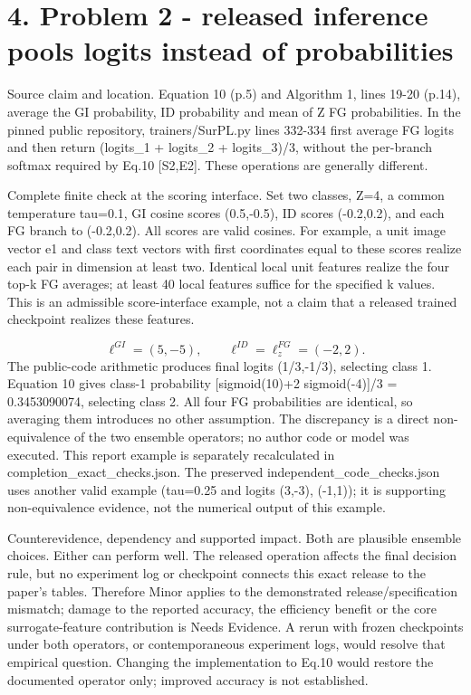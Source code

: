 \documentclass[10pt]{article}
\begin{document}
\section*{4. Problem 2 - released inference pools logits instead of probabilities}
Source claim and location. Equation 10 (p.5) and Algorithm 1, lines 19-20 (p.14), average the GI probability, ID probability and mean of Z FG probabilities. In the pinned public repository, trainers/SurPL.py lines 332-334 first average FG logits and then return (logits\_1 + logits\_2 + logits\_3)/3, without the per-branch softmax required by Eq.10 [S2,E2]. These operations are generally different.\par
Complete finite check at the scoring interface. Set two classes, Z=4, a common temperature tau=0.1, GI cosine scores (0.5,-0.5), ID scores (-0.2,0.2), and each FG branch to (-0.2,0.2). All scores are valid cosines. For example, a unit image vector e1 and class text vectors with first coordinates equal to these scores realize each pair in dimension at least two. Identical local unit features realize the four top-k FG averages; at least 40 local features suffice for the specified k values. This is an admissible score-interface example, not a claim that a released trained checkpoint realizes these features.\par
\[\ell^{GI}=(5,-5),\qquad\ell^{ID}=\ell^{FG}_z=(-2,2).\] The public-code arithmetic produces final logits (1/3,-1/3), selecting class 1. Equation 10 gives class-1 probability [sigmoid(10)+2 sigmoid(-4)]/3 = 0.3453090074, selecting class 2. All four FG probabilities are identical, so averaging them introduces no other assumption. The discrepancy is a direct non-equivalence of the two ensemble operators; no author code or model was executed. This report example is separately recalculated in completion\_exact\_checks.json. The preserved independent\_code\_checks.json uses another valid example (tau=0.25 and logits (3,-3), (-1,1)); it is supporting non-equivalence evidence, not the numerical output of this example.\par
Counterevidence, dependency and supported impact. Both are plausible ensemble choices. Either can perform well. The released operation affects the final decision rule, but no experiment log or checkpoint connects this exact release to the paper’s tables. Therefore Minor applies to the demonstrated release/specification mismatch; damage to the reported accuracy, the efficiency benefit or the core surrogate-feature contribution is Needs Evidence. A rerun with frozen checkpoints under both operators, or contemporaneous experiment logs, would resolve that empirical question. Changing the implementation to Eq.10 would restore the documented operator only; improved accuracy is not established.\par
\end{document}
